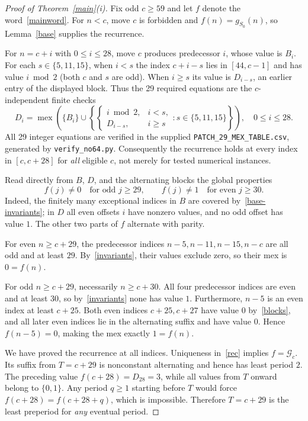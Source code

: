 \documentclass[10pt,a4paper]{article}
\newcommand{\mex}{\operatorname{mex}}
\newcommand{\SG}{\mathcal{G}}
\begin{document}
\begin{proof}[Proof of Theorem~\ref{main}(i)]
Fix odd $c\ge59$ and let $f$ denote the word~\eqref{mainword}. For $n<c$, move $c$ is forbidden and $f(n)=g_{S_0}(n)$, so Lemma~\ref{base} supplies the recurrence.

For $n=c+i$ with $0\le i\le28$, move $c$ produces predecessor $i$, whose value is $B_i$. For each $s\in\{5,11,15\}$, when $i<s$ the index $c+i-s$ lies in $[44,c-1]$ and has value $i\bmod2$ (both $c$ and $s$ are odd). When $i\ge s$ its value is $D_{i-s}$, an earlier entry of the displayed block. Thus the 29 required equations are the $c$-independent finite checks
\begin{equation}\label{patch}
 D_i=\mex\left(\{B_i\}\cup\left\{\begin{cases}
i\bmod2,&i<s,\\
D_{i-s},&i\ge s
\end{cases}:s\in\{5,11,15\}\right\}\right),\quad 0\le i\le28.
\end{equation}
All 29 integer equations are verified in the supplied \texttt{PATCH\_29\_MEX\_TABLE.csv}, generated by \texttt{verify\_no64.py}. Consequently the recurrence holds at every index in $[c,c+28]$ for \emph{all} eligible $c$, not merely for tested numerical instances.

Read directly from $B$, $D$, and the alternating blocks the global properties
\begin{equation}\label{invariants}
 f(j)\ne0\quad\text{for odd }j\ge29,\qquad
 f(j)\ne1\quad\text{for even }j\ge30.
\end{equation}
Indeed, the finitely many exceptional indices in $B$ are covered by~\eqref{base-invariants}; in $D$ all even offsets $i$ have nonzero values, and no odd offset has value $1$. The other two parts of $f$ alternate with parity.

For even $n\ge c+29$, the predecessor indices $n-5,n-11,n-15,n-c$ are all odd and at least $29$. By~\eqref{invariants}, their values exclude zero, so their mex is $0=f(n)$.

For odd $n\ge c+29$, necessarily $n\ge c+30$. All four predecessor indices are even and at least $30$, so by~\eqref{invariants} none has value $1$. Furthermore, $n-5$ is an even index at least $c+25$. Both even indices $c+25,c+27$ have value $0$ by~\eqref{blocks}, and all later even indices lie in the alternating suffix and have value $0$. Hence $f(n-5)=0$, making the mex exactly $1=f(n)$.

We have proved the recurrence at all indices. Uniqueness in~\eqref{rec} implies $f=\SG_c$. Its suffix from $T=c+29$ is nonconstant alternating and hence has least period $2$. The preceding value $f(c+28)=D_{28}=3$, while all values from $T$ onward belong to $\{0,1\}$. Any period $q\ge1$ starting before $T$ would force $f(c+28)=f(c+28+q)$, which is impossible. Therefore $T=c+29$ is the least preperiod for \emph{any} eventual period.
\end{proof}
\end{document}
